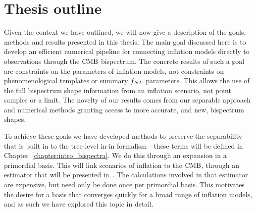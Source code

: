     




\section{Thesis outline}
Given the context we have outlined,
    we will now give a description of the goals, methods
    and results presented in this thesis.
    The main goal discussed here is to develop an efficient numerical pipeline for
    connecting inflation models directly to observations through the $\text{CMB}$ bispectrum.
    The concrete results of such a goal are constraints on the parameters of inflation models,
    not constraints on phenomenological templates or summary $f_{NL}$ parameters.
    This allows the use of the full bispectrum shape information from an inflation scenario,
    not point samples or a limit. The novelty of our results comes from our separable
    approach and numerical methods
    granting access to more accurate, and new, bispectrum shapes.


    To achieve these goals we have developed methods to preserve the
    separability that is built in to the tree-level in-in formalism---these
    terms will be defined in Chapter~\ref{chapter:intro_bispectra}.
    We do this through an expansion in a primordial basis.
    This will link scenarios of inflation to the $\text{CMB}$,
    through an estimator that will be presented in~\cite{Sohn_2021}.
    The calculations involved in that estimator are expensive,
    but need only be done once per primordial basis.
    This motivates the desire for a basis that converges quickly for a broad range of inflation models,
    and as such we have explored this topic in detail.



